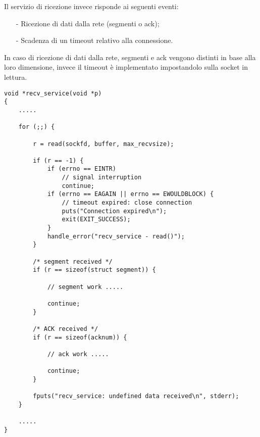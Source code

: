 %
Il servizio di ricezione invece risponde ai seguenti eventi:
\begin{itemize}
\item[-]Ricezione di dati dalla rete (segmenti o ack);
\item[-]Scadenza di un timeout relativo alla connessione.
\end{itemize}
%
In caso di ricezione di dati dalla rete, segmenti e ack vengono distinti in 
base alla loro dimensione, invece il timeout è implementato impostandolo
sulla socket in lettura.
%
\begin{lstlisting}[title=transport.c]
void *recv_service(void *p)
{
	.....

    for (;;) {

        r = read(sockfd, buffer, max_recvsize);

        if (r == -1) {
            if (errno == EINTR)
                // signal interruption
                continue;
            if (errno == EAGAIN || errno == EWOULDBLOCK) {
                // timeout expired: close connection
                puts("Connection expired\n");
                exit(EXIT_SUCCESS);
            }
            handle_error("recv_service - read()");
        }

        /* segment received */
        if (r == sizeof(struct segment)) {

            // segment work .....
            
            continue;
        }

        /* ACK received */
        if (r == sizeof(acknum)) {

            // ack work .....

            continue;
        }

        fputs("recv_service: undefined data received\n", stderr);
    }

	.....
}
\end{lstlisting}
